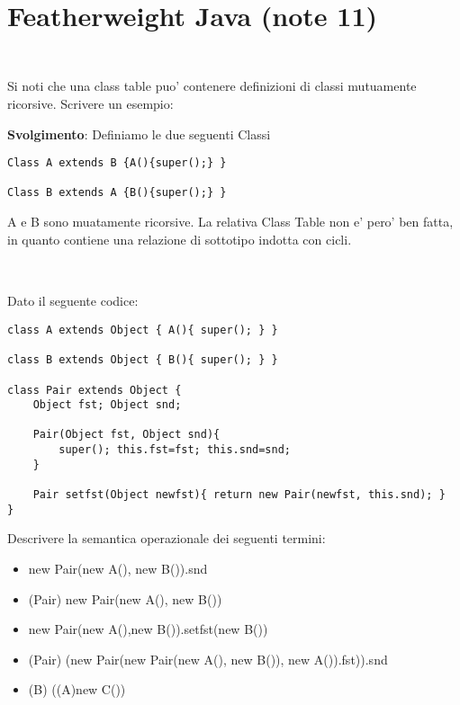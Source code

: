 \section{Featherweight Java (note 11)} 
\subsection*{}\
\\ 
Si noti che una class table puo' contenere definizioni di classi mutuamente ricorsive.
\linebreak Scrivere un esempio:


\vspace{0,5cm}
\noindent
\textbf{Svolgimento}:\linebreak
Definiamo le due seguenti Classi

\begin{lstlisting}
Class A extends B {A(){super();} }

Class B extends A {B(){super();} }

\end{lstlisting}

\noindent
A e B sono muatamente ricorsive. La relativa Class Table non e' pero' ben fatta, in quanto contiene una relazione di sottotipo indotta con cicli.

\vspace{1cm}
\subsection*{}\
\\ 
Dato il seguente codice:
\begin{lstlisting}
class A extends Object { A(){ super(); } }

class B extends Object { B(){ super(); } }

class Pair extends Object { 
	Object fst; Object snd;
	
	Pair(Object fst, Object snd){
		super(); this.fst=fst; this.snd=snd; 
	} 
	
	Pair setfst(Object newfst){ return new Pair(newfst, this.snd); }
}

\end{lstlisting}

\vspace{0,5cm}
Descrivere la semantica operazionale dei seguenti termini:

\begin{itemize}
\item new Pair(new A(), new B()).snd
\item (Pair) new Pair(new A(), new B())
\item new Pair(new A(),new B()).setfst(new B())
\item (Pair) (new Pair(new Pair(new A(), new B()), new A()).fst)).snd
\item (B) ((A)new C())
\end{itemize}

